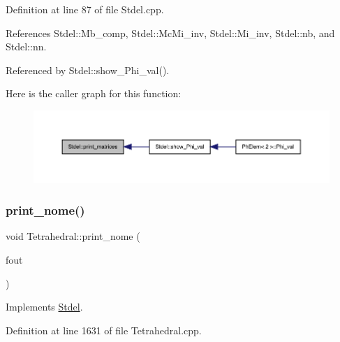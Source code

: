 Definition at line 87 of file Stdel.\+cpp.



References Stdel\+::\+Mb\+\_\+comp, Stdel\+::\+Mc\+Mi\+\_\+inv, Stdel\+::\+Mi\+\_\+inv, Stdel\+::nb, and Stdel\+::nn.



Referenced by Stdel\+::show\+\_\+\+Phi\+\_\+val().

Here is the caller graph for this function\+:
\nopagebreak
\begin{figure}[H]
\begin{center}
\leavevmode
\includegraphics[width=350pt]{classStdel_a319e6a16011b22e12028a841b7686f03_icgraph}
\end{center}
\end{figure}
\mbox{\label{classTetrahedral_a8b37140c6823e724fc1eae1986ec69ff}} 
\subsubsection{\texorpdfstring{print\+\_\+nome()}{print\_nome()}}
{\footnotesize\ttfamily void Tetrahedral\+::print\+\_\+nome (\begin{DoxyParamCaption}\item[{F\+I\+LE $\ast$}]{fout }\end{DoxyParamCaption})\hspace{0.3cm}{\ttfamily [virtual]}}



Implements \hyperlink{classStdel_ac654f45f744ec4cfeab74ed4ded99ef5}{Stdel}.



Definition at line 1631 of file Tetrahedral.\+cpp.

\mbox{\label{classTetrahedral_aa5daeb6d0461824263d4af49aeb15134}} 
